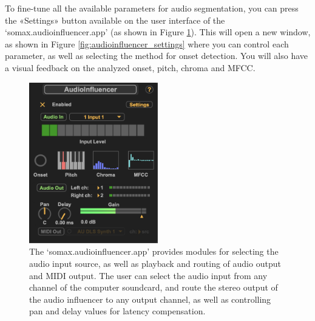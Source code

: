 To fine-tune all the available parameters for audio segmentation, you can press the «Settings» button available on the user interface of the `somax.audioinfluencer.app' (as shown in Figure \ref{fig:audioinfluencer_app}). This will open a new window, as shown in Figure \ref{fig:audioinfluencer_settings} where you can control each parameter, as well as selecting the method for onset detection. You will also have a visual feedback on the analyzed onset, pitch, chroma and MFCC.


 \begin{figure}[H]
    \centering        
 	\includegraphics[width=0.5\textwidth, keepaspectratio]{img/audioinfluencer_app.png}
    \caption{The `somax.audioinfluencer.app' provides modules for selecting the audio input source, as well as playback and routing of audio output and MIDI output. The user can select the audio input from any channel of the computer soundcard, and route the stereo output of the audio influencer to any output channel, as well as controlling pan and delay values for latency compensation.}
    \label{fig:audioinfluencer_app}
\end{figure}


